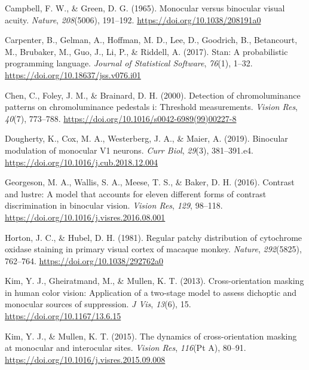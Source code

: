 \documentclass[
]{article}
\newlength{\cslhangindent}
\newlength{\cslentryspacingunit} %
\newenvironment{CSLReferences}[2] %
 {%
  \setlength{\parindent}{0pt}
  \ifodd #1
  \let\oldpar\par
  \def\par{\hangindent=\cslhangindent\oldpar}
  \fi
  \setlength{\parskip}{#2\cslentryspacingunit}
 }%
 {}
\begin{document}
\begin{CSLReferences}{1}{0}
\leavevmode{}%
Campbell, F. W., \& Green, D. G. (1965). Monocular versus binocular visual acuity. \emph{Nature}, \emph{208}(5006), 191--192. \url{https://doi.org/10.1038/208191a0}

\leavevmode{}%
Carpenter, B., Gelman, A., Hoffman, M. D., Lee, D., Goodrich, B., Betancourt, M., Brubaker, M., Guo, J., Li, P., \& Riddell, A. (2017). Stan: A probabilistic programming language. \emph{Journal of Statistical Software}, \emph{76}(1), 1--32. \url{https://doi.org/10.18637/jss.v076.i01}

\leavevmode{}%
Chen, C., Foley, J. M., \& Brainard, D. H. (2000). Detection of chromoluminance patterns on chromoluminance pedestals i: Threshold measurements. \emph{Vision Res}, \emph{40}(7), 773--788. \url{https://doi.org/10.1016/s0042-6989(99)00227-8}

\leavevmode{}%
Dougherty, K., Cox, M. A., Westerberg, J. A., \& Maier, A. (2019). Binocular modulation of monocular V1 neurons. \emph{Curr Biol}, \emph{29}(3), 381--391.e4. \url{https://doi.org/10.1016/j.cub.2018.12.004}

\leavevmode{}%
Georgeson, M. A., Wallis, S. A., Meese, T. S., \& Baker, D. H. (2016). Contrast and lustre: A model that accounts for eleven different forms of contrast discrimination in binocular vision. \emph{Vision Res}, \emph{129}, 98--118. \url{https://doi.org/10.1016/j.visres.2016.08.001}

\leavevmode{}%
Horton, J. C., \& Hubel, D. H. (1981). Regular patchy distribution of cytochrome oxidase staining in primary visual cortex of macaque monkey. \emph{Nature}, \emph{292}(5825), 762--764. \url{https://doi.org/10.1038/292762a0}

\leavevmode{}%
Kim, Y. J., Gheiratmand, M., \& Mullen, K. T. (2013). Cross-orientation masking in human color vision: Application of a two-stage model to assess dichoptic and monocular sources of suppression. \emph{J Vis}, \emph{13}(6), 15. \url{https://doi.org/10.1167/13.6.15}

\leavevmode{}%
Kim, Y. J., \& Mullen, K. T. (2015). The dynamics of cross-orientation masking at monocular and interocular sites. \emph{Vision Res}, \emph{116}(Pt A), 80--91. \url{https://doi.org/10.1016/j.visres.2015.09.008}


\end{CSLReferences}
\end{document}

